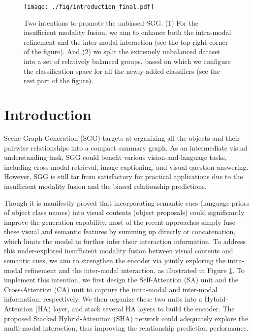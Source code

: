 \documentclass[10pt,twocolumn,letterpaper]{article}
\begin{document}
\begin{figure}[t]
	\centering
	\texttt{[image: ./fig/introduction\_final.pdf]}
	\vspace{-0.2cm}
	\caption{Two intentions to promote the unbiased SGG. (1) For the insufficient modality fusion, we aim to enhance both the intra-modal refinement and the inter-modal interaction (see the top-right corner of the figure). And (2) we split the extremely unbalanced dataset into a set of relatively balanced groups, based on which we configure the classification space for all the newly-added classifiers (see the rest part of the figure).}
	\vspace{-0.3cm}
	\label{introduction}
\end{figure}


\section{Introduction}
\label{sec:intro}

Scene Graph Generation (SGG) \cite{xu2020survey} targets at organizing all the objects and their pairwise relationships into a compact summary graph. As an intermediate visual understanding task, SGG could benefit various vision-and-language tasks, including cross-modal retrieval\cite{guo2020visual,song2021spatial,dhamo2020semantic}, image captioning\cite{zhong2020comprehensive,chen2020say,gu2019unpaired}, and visual question answering\cite{teney2017graph,zhang2019empirical,hildebrandt2020scene}. However, SGG is still far from satisfactory for practical applications due to the insufficient modality fusion and the biased relationship predictions. 

Though it is manifestly proved that incorporating semantic cues (language priors of object class names) into visual contents (object proposals) could significantly improve the generation capability\cite{lu2016visual, liang2018visual}, most of the recent approaches\cite{zellers2018neural,tang2019learning,tang2020unbiased,yan2020pcpl,yu2020cogtree,li2021bipartite,zareian2020bridging,sharifzadeh2020classification} simply fuse these visual and semantic features by summing up directly or concatenation, which limits the model to further infer their interaction information. To address this under-explored insufficient modality fusion between visual contents and semantic cues, we aim to strengthen the encoder via jointly exploring the intra-modal refinement and the inter-modal interaction, as illustrated in Figure \ref{introduction}. To implement this intention, we first design the Self-Attention (SA) unit and the Cross-Attention (CA) unit to capture the intra-modal and inter-modal information, respectively. We then organize these two units into a Hybrid-Attention (HA) layer, and stack several HA layers to build the encoder. The proposed Stacked Hybrid-Attention (SHA) network could adequately explore the multi-modal interaction, thus improving the relationship prediction performance.
\end{document}

